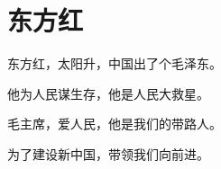 \documentclass[12pt,UTF-8,openany]{ctexbook}
\begin{document}
\clearpage

\begin{center}
    
    
\end{center}


\hanzibox{}\hanzibox{}\hanzibox{}\hanzibox{}\hspace{1em}\hanzibox{}\hanzibox{}\hanzibox{}\hanzibox{}

\hanzibox{}\hanzibox{}\hanzibox{}\hanzibox{}\hspace{1em}\hanzibox{}\hanzibox{}\hanzibox{}\hanzibox{}

\hanzibox{}\hanzibox{}\hanzibox{}\hanzibox{}\hspace{1em}\hanzibox{}\hanzibox{}\hanzibox{}\hanzibox{}






\chapter{东方红}

\begin{large}
    
    东方红，太阳升，中国出了个毛泽东。
    
    他为人民谋生存，他是人民大救星。
    
    毛主席，爱人民，他是我们的带路人。
    
    为了建设新中国，带领我们向前进。
    
\end{large}


\clearpage

\begin{center}
    
\end{center}


\hanzibox{}\hanzibox{}\hanzibox{}\hanzibox{}\hspace{1em}\hanzibox{}\hanzibox{}\hanzibox{}\hanzibox{}

\hanzibox{}\hanzibox{}\hanzibox{}\hanzibox{}\hspace{1em}\hanzibox{}\hanzibox{}\hanzibox{}\hanzibox{}
\end{document}
